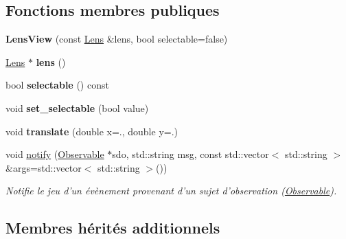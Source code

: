 \subsection*{Fonctions membres publiques}
\begin{DoxyCompactItemize}
\item 
\hypertarget{classLensView_a678ca25c84417e53af04258d27e5979a}{{\bfseries Lens\+View} (const \hyperlink{classLens}{Lens} \&lens, bool selectable=false)}\label{classLensView_a678ca25c84417e53af04258d27e5979a}

\item 
\hypertarget{classLensView_a9af15abae80b9588e61de5a0d929101f}{\hyperlink{classLens}{Lens} $\ast$ {\bfseries lens} ()}\label{classLensView_a9af15abae80b9588e61de5a0d929101f}

\item 
\hypertarget{classLensView_abcf4b929c4008fe2d0d464e1ec113037}{bool {\bfseries selectable} () const }\label{classLensView_abcf4b929c4008fe2d0d464e1ec113037}

\item 
\hypertarget{classLensView_a3a35c1e61503da599b1d9c93c176dffd}{void {\bfseries set\+\_\+selectable} (bool value)}\label{classLensView_a3a35c1e61503da599b1d9c93c176dffd}

\item 
\hypertarget{classLensView_a60a6a9fa6212d8d5997c77f8ee63b38d}{void {\bfseries translate} (double x=., double y=.)}\label{classLensView_a60a6a9fa6212d8d5997c77f8ee63b38d}

\item 
void \hyperlink{classLensView_a55574a71ccc10e389b155b4029f74d5a}{notify} (\hyperlink{classObservable}{Observable} $\ast$sdo, std\+::string msg, const std\+::vector$<$ std\+::string $>$ \&args=std\+::vector$<$ std\+::string $>$())
\begin{DoxyCompactList}\small\item\em Notifie le jeu d'un évènement provenant d'un sujet d'observation (\hyperlink{classObservable}{Observable}). \end{DoxyCompactList}\end{DoxyCompactItemize}
\subsection*{Membres hérités additionnels}


